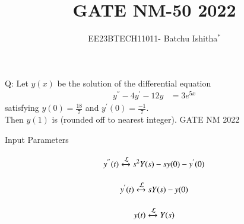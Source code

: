\documentclass[journal,12pt,twocolumn]{IEEEtran}
\theoremstyle{remark}
\begin{document}
\newcommand\tabref{Table~\ref}
\newcommand{\sinc}{\,\text{sinc}\,}
\newcommand{\rect}{\,\text{rect}\,}

\let\vec\mathbf



\title{ GATE NM-50 2022}
\author{EE23BTECH11011- Batchu Ishitha$^{*}$%
}
\maketitle




\bigskip

\renewcommand{\thefigure}{\theenumi}
\renewcommand{\thetable}{\theenumi}

Q:  Let $y(x)$ be the solution of the differential equation 
\begin{align}
y^{''} - 4y^{'} -12y &= 3e^{5x} 
 \label{eq:ishitha.g22.nm.50.1.eq}
\end{align}
satisfying $y(0)=\frac{18}{7}$ and $y^{'}(0)=\frac{-1}{7}$. \\
Then $y(1)$ is \underline{\hspace{2.5cm}}  (rounded off to nearest integer).      \hfill{GATE NM 2022 }

\solution
\fi
\begin{table}[!ht]    
    \centering
    \resizebox{9cm}{1cm}{
         
    }
    \caption{Input Parameters}
    \label{table:ishitha.g22.nm.50.t1}
\end{table}

\begin{equation}
y^{''}(t) \stackrel{}{\xleftrightarrow{\mathcal{L}}} s^{2}Y(s)-sy(0)-y^{'}(0) \\ \label{eq:ishitha.g22.nm.50.2.eq}
\end{equation}

\begin{equation}
y^{'}(t)  \stackrel{}{\xleftrightarrow{\mathcal{L}}} sY(s)-y(0) \\ \label{eq:ishitha.g22.nm.50.3.eq}
\end{equation}

\begin{equation}
y(t)     \stackrel{}{\xleftrightarrow{\mathcal{L}}}   Y(s) \\ \label{eq:ishitha.g22.nm.50.4.eq}
\end{equation}
\end{document}
